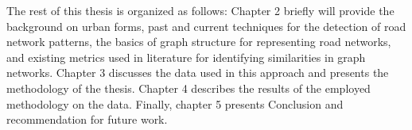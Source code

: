 The rest of this thesis is organized as follows: Chapter 2 briefly will provide the background on urban forms, past and current techniques for the detection of road network patterns, the basics of graph structure for representing road networks, and existing metrics used in literature for identifying similarities in graph networks. Chapter 3 discusses the data used in this approach  and presents the methodology of the thesis. Chapter 4 describes the results of the employed methodology on the data. Finally, chapter 5 presents Conclusion and recommendation for future work. 


